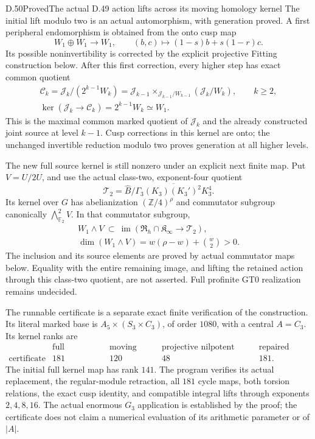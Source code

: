 \begin{statement}{D.50}{Proved}{The actual D.49 action lifts across its moving homology kernel}
The initial lift modulo two is an actual automorphism,
with generation proved. A first peripheral endomorphism
is obtained from the onto cusp map
\[
 W_1\oplus W_1\longrightarrow W_1,\qquad
 (b,c)\longmapsto(1-s)b+s(1-r)c.
 \tag{D.50.6}
\]
Its possible noninvertibility is corrected by the
explicit projective Fitting construction below.
After this first correction, every higher step has
exact common quotient
\[
 \begin{gathered}
 \mathcal C_k
   =\mathcal J_k/(2^{k-1}W_k)
   =\mathcal J_{k-1}
       \times_{\mathcal J_{k-1}/W_{k-1}}
                 (\mathcal J_k/W_k),\qquad k\ge2,\\
 \ker(\mathcal J_k\to\mathcal C_k)
       =2^{k-1}W_k\simeq W_1 .
 \end{gathered}
 \tag{D.50.7}
\]
This is the maximal common marked quotient of
\(\mathcal J_k\) and the already constructed joint
source at level \(k-1\). Cusp corrections in this
kernel are onto; the unchanged invertible reduction
modulo two proves generation at all higher levels.

The new full source kernel is still nonzero under
an explicit next finite map. Put \(V=U/2U\), and use
the actual class-two, exponent-four quotient
\[
 \mathcal T_2
   =\widehat B/
      \overline{\Gamma_3(K_3)(K_3')^2K_3^4}.
 \tag{D.50.8}
\]
Its kernel over \(G\) has abelianization
\((\mathbb Z/4)^\rho\) and commutator subgroup canonically
\(\bigwedge^2_{\mathbb F_2}V\). In that commutator subgroup,
\[
 \begin{gathered}
 W_1\wedge V
 \ \subset\
 \operatorname{im}(\mathfrak R_h\cap\mathfrak K_\infty
                                  \to\mathcal T_2),\\
 \dim(W_1\wedge V)
     =w(\rho-w)+\binom w2>0 .
 \end{gathered}
 \tag{D.50.9}
\]
The inclusion and its source elements are proved by
actual commutator maps below. Equality with the entire
remaining image, and lifting the retained action
through this class-two quotient, are not asserted.
Full profinite GT0 realization remains undecided.

The runnable certificate is a separate exact finite
verification of the construction. Its literal marked
base is \(A_5\times(S_3\times C_3)\), of order \(1080\),
with a central \(A=C_3\). Its kernel ranks are
\[
 \begin{array}{c|rrrr}
 &\text{full homology}&\text{moving part}
       &\text{projective nilpotent part}&\text{repaired rank}\\ \hline
 \text{certificate}&181&120&48&181 .
 \end{array}
 \tag{D.50.10}
\]
The initial full kernel map has rank \(141\).
The program verifies its actual replacement, the
regular-module retraction, all \(181\) cycle maps,
both torsion relations, the exact cusp identity,
and compatible integral lifts through exponents
\(2,4,8,16\). The actual enormous \(G_3\) application
is established by the proof; the certificate does
not claim a numerical evaluation of its arithmetic
parameter or of \(|A|\).


\end{statement}
